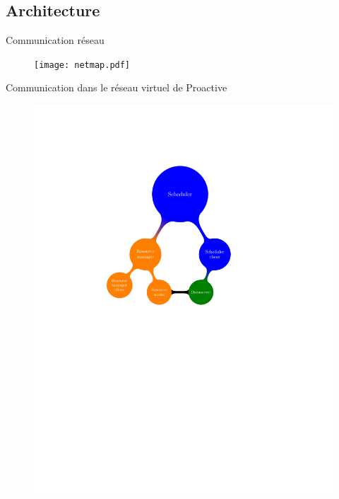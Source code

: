 \documentclass[handout]{beamer}
\begin{document}
\subsection{Architecture}

\begin{frame}{Communication réseau}
    \vspace{-1.9cm}
    \begin{figure}
        \hspace*{-1.8cm}
        \centering
        \texttt{[image: netmap.pdf]}
    \end{figure}
    
\end{frame}

\begin{frame}{Communication dans le réseau virtuel de Proactive}
    \vspace{-2.9cm}
    \begin{figure}
        \hspace*{-1.2cm}
        \centering
        \includegraphics[scale=0.62]{netmap_abs.pdf}
    \end{figure}
    
\end{frame}
\end{document}
